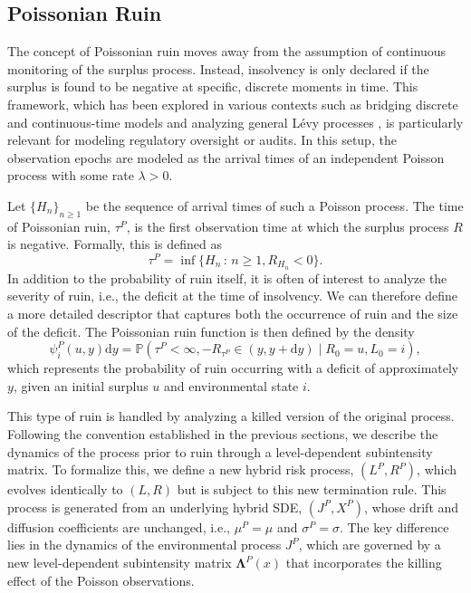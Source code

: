 \documentclass[11pt]{article}
\numberwithin{table}{section}
\numberwithin{figure}{section}
\numberwithin{equation}{section}
\newcommand{\dd}{\mathrm{d}}
\newcommand{\1}{{\mathbf 1}}
\newcommand{\0}{\mat{0}}
\begin{document}
\subsection{Poissonian Ruin}

The concept of Poissonian ruin moves away from the assumption of continuous monitoring of the surplus process. Instead, insolvency is only declared if the surplus is found to be negative at specific, discrete moments in time. This framework, which has been explored in various contexts such as bridging discrete and continuous-time models and analyzing general Lévy processes \cite{albrecher2016exit, albrecher2017strikingly}, is particularly relevant for modeling regulatory oversight or audits. In this setup, the observation epochs are modeled as the arrival times of an independent Poisson process with some rate \(\lambda>0\).

Let \(\{H_n\}_{n \ge 1}\) be the sequence of arrival times of such a Poisson process. The time of Poissonian ruin, \(\tau^P\), is the first observation time at which the surplus process \(R\) is negative. Formally, this is defined as
\[
\tau^P = \inf\{ H_n \,:\, n \ge 1, R_{H_n} < 0 \}.
\]
In addition to the probability of ruin itself, it is often of interest to analyze the severity of ruin, i.e., the deficit at the time of insolvency. We can therefore define a more detailed descriptor that captures both the occurrence of ruin and the size of the deficit. The Poissonian ruin function is then defined by the density
\[
\psi_i^P(u, y) \dd y = \mathbb{P}(\tau^P < \infty, -R_{\tau^P} \in (y, y+\dd y) \mid R_0 = u, L_0 = i),
\]
which represents the probability of ruin occurring with a deficit of approximately \(y\), given an initial surplus \(u\) and environmental state \(i\).

This type of ruin is handled by analyzing a killed version of the original process. Following the convention established in the previous sections, we describe the dynamics of the process prior to ruin through a level-dependent subintensity matrix. To formalize this, we define a new hybrid risk process, \((L^P, R^P)\), which evolves identically to \((L,R)\) but is subject to this new termination rule. This process is generated from an underlying hybrid SDE, \((J^P, X^P)\), whose drift and diffusion coefficients are unchanged, i.e., \(\mu^P = \mu\) and \(\sigma^P = \sigma\). The key difference lies in the dynamics of the environmental process \(J^P\), which are governed by a new level-dependent subintensity matrix \(\bm{\Lambda}^P(x)\) that incorporates the killing effect of the Poisson observations.
\end{document}

